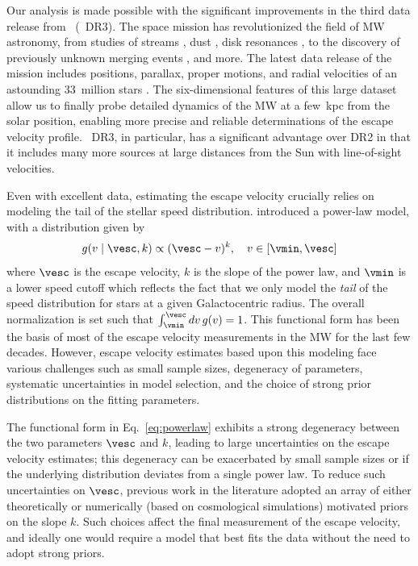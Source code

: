 Our analysis is made possible with the significant improvements in the third data release from \Gaia~(\Gaia~DR3). The \Gaia space mission \citep{gaia:2016, gaiaDR1, gaiaDR2, GaiaeDR3} has revolutionized the field of MW astronomy, from studies of streams \citep{malhan:2018, price-whelan:2018, helmi:2020, chandra:2023}, dust \citep{green:2019, lallement:2019, leike:2020}, disk resonances \citep{kawata:2018, trick:2021}, to the discovery of previously unknown merging events \citep{2018Natur.563...85H,2018MNRAS.478..611B,2020Necib,Naidu2020}, and more. The latest data release of the \Gaia mission includes positions, parallax, proper motions, and radial velocities of an astounding 33~million stars \citep{gaiaDR3, gaiaRVs}. The six-dimensional features of this large dataset allow us to finally probe detailed dynamics of the MW at a few~kpc from the solar position, enabling more precise and reliable determinations of the escape velocity profile. \Gaia~DR3, in particular, has a significant advantage over DR2 in that it includes many more sources at large distances from the Sun with line-of-sight velocities. 

Even with excellent data, estimating the escape velocity crucially relies on modeling the tail of the stellar speed distribution.  \cite{Leonard1990} introduced a power-law model, with a distribution given by
\begin{equation} \label{eq:powerlaw}
    g(v \mid \vesc, k) \propto (\vesc - v)^{k}, \quad v\in[\vmin,\vesc]
\end{equation}
where $\vesc$ is the escape velocity, $k$ is the slope of the power law, and $\vmin$ is a lower speed cutoff which reflects the fact that we only model the \textit{tail} of the speed distribution for stars at a given Galactocentric radius. The overall normalization is set such that $\int_{\vmin}^{\vesc} dv \, g(v) = 1$. This functional form has been the basis of most of the escape velocity measurements in the MW for the last few decades. However, escape velocity estimates based upon this modeling \citep{smith:2007, Piffl2014, Monari2018, deason:2019, Koppelman2021, Necib2022} face various challenges such as small sample sizes, degeneracy of parameters, systematic uncertainties in model selection, and the choice of strong prior distributions on the fitting parameters. 

The functional form  in Eq.~\ref{eq:powerlaw} exhibits a strong degeneracy between the two parameters $\vesc$ and $k$, leading to large uncertainties on the escape velocity estimates; this degeneracy can be exacerbated by small sample sizes or if the underlying distribution deviates from a single power law. To reduce such uncertainties on $\vesc$, previous work in the literature adopted an array of either theoretically or numerically (based on cosmological simulations) motivated priors on the slope $k$. Such choices affect the final measurement of the escape velocity, and ideally one would require a model that best fits the data without the need to adopt strong priors. 

